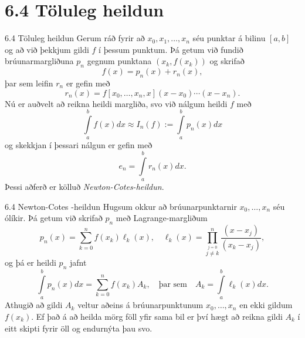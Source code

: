 \section*{6.4 Töluleg heildun}
\begin{frame}{6.4 Töluleg heildun} 
Gerum ráð fyrir að $x_0,x_1, \ldots, x_n$ séu punktar á bilinu $[a,b]$
og að við þekkjum gildi $f$ í þessum punktum. Þá getum við fundið
brúunarmargliðuna $p_n$ gegnum punktana $(x_k,f(x_k))$ og skrifað 
\begin{equation*}
  f(x) = p_n(x) + r_n(x),
\end{equation*} 
þar sem leifin $r_n$ er gefin með
\begin{equation*}
  r_n(x) = f[x_0,\ldots,x_n,x](x-x_0)\cdots(x-x_n).
\end{equation*}
\pause
Nú er auðvelt að reikna heildi margliða, svo við nálgum heildi $f$ með
\begin{equation*}
  \int\limits_a^b f(x) dx \approx 
  I_n(f) := \int\limits_a^b p_n(x) dx
\end{equation*}
\pause
og skekkjan í þessari nálgun er gefin með
\begin{equation*}
  e_n = \int\limits_a^b r_n(x) dx.
\end{equation*}
Þessi aðferð er kölluð {\it Newton-Cotes-heildun}. 
\end{frame}


\begin{frame}{6.4 Newton-Cotes -heildun} 
Hugsum okkur að brúunarpunktarnir $x_0, \ldots, x_n$ séu ólíkir. Þá
getum við skrifað $p_n$ með Lagrange-margliðum 
\begin{equation*}
  p_n(x) = \sum\limits_{k=0}^n f(x_k) \ell_k(x),
  \quad
  \ell_k(x) = \prod\limits_{\stackrel{j=0}{j \not= k}}^n
  \frac{(x-x_j)}{(x_k-x_j)},
\end{equation*}
\pause
og þá er heildi $p_n$ jafnt
\begin{equation*}
  \int\limits_a^b p_n(x) dx = 
  \sum\limits_{k=0}^n f(x_k) A_k,
  \quad \text{þar sem} \quad
  A_k = \int\limits_a^b \ell_k(x) dx.
\end{equation*}
\pause
Athugið að gildi $A_k$ veltur aðeins á brúunarpunktunum $x_0, \ldots,
x_n$ en ekki gildum $f(x_k)$. Ef það á að heilda mörg föll yfir sama
bil er því hægt að reikna gildi $A_k$ í eitt skipti fyrir öll og
endurnýta þau svo. 
\end{frame}


